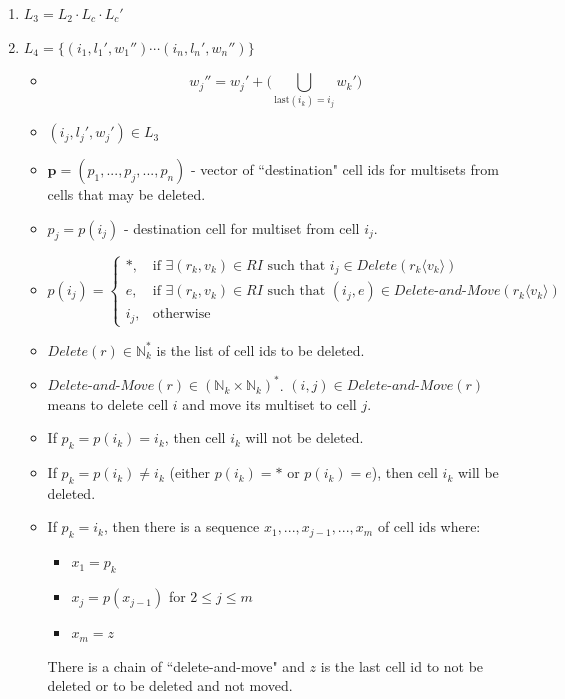 \documentclass{article}
\newcommand{\mn}{\text{-}}
\begin{document}
\begin{appendices}
\begin{enumerate}
   \item $L_3 = L_2 \cdot  L_c \cdot L_c'$
   \item $L_4 = \{(i_1, l_1', w_1'') \cdots (i_n, l_n', w_n'')\}$
         \begin{itemize}
         \item $$w_j'' = w_j' + \Bigg(\bigcup_{\text{last}(i_k)=i_j} w_k' \Bigg)$$
         \item $(i_j, l_j', w_j') \in L_3$
         \item $\textbf{p} = (p_1,...,p_j,...,p_n)$ - vector of ``destination" cell ids for multisets from cells that may be deleted.
         \item $p_j = p(i_j)$ - destination cell for multiset from cell $i_j$. 
         \item \[ p(i_j) = \begin{cases} 
                           *  , & \text{if } \exists(r_k,v_k)\in RI \text{ such that } i_j \in Delete(r_k\langle v_k\rangle)\\
                           e  , & \text{if } \exists(r_k,v_k)\in RI \text{ such that } (i_j,e) \in Delete\mn and\mn Move(r_k\langle v_k\rangle)\\
                           i_j, & \text{otherwise} 
                           \end{cases}\] 
         \item $Delete(r) \in \mathbb{N}_k^*$ is the list of cell ids to be deleted.
         \item $Delete\mn and\mn Move(r) \in (\mathbb{N}_k \times \mathbb{N}_k)^*$. $(i,j) \in Delete\mn and\mn Move(r)$ means to delete cell $i$ and move its multiset to
               cell $j$.
         \item If $p_k = p(i_k) = i_k$, then cell $i_k$ will not be deleted.
         \item If $p_k = p(i_k) \neq i_k$ (either $p(i_k)= *$ or $p(i_k)=e$), then cell $i_k$ will be deleted.
         \item If $p_k = i_k$, then there is a sequence $x_1,...,x_{j-1},...,x_m$ of cell ids where:
               \begin{itemize}
                  \item $x_1 = p_k$
                  \item $x_j = p(x_{j-1})$ for $2 \leq j \leq m$
                  \item $x_m = z$ 
               \end{itemize}
               There is a chain of ``delete-and-move" and $z$ is the last cell id to not be deleted or to be deleted and not moved.

\end{itemize}
\end{enumerate}
\end{appendices}
\end{document}
